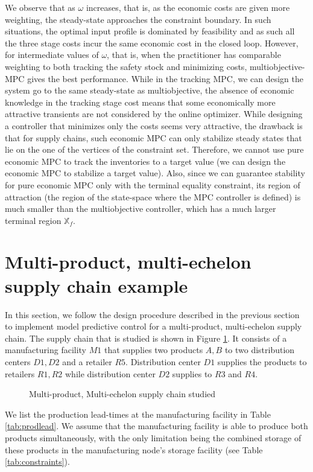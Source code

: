 \documentclass[10pt]{article}
\theoremstyle{definition}
\begin{document}
We observe that as $\omega$ increases, that is, as the economic costs
are given more weighting, the steady-state approaches the constraint
boundary. In such situations, the optimal input profile is dominated
by feasibility and as such all the three stage costs incur the same
economic cost in the closed loop. However, for intermediate values of
$\omega$, that is, when the practitioner has comparable weighting to
both tracking the safety stock and minimizing costs,
multiobjective-MPC gives the best performance. While in the tracking
MPC, we can design the system go to the same steady-state as multiobjective, the absence of
economic knowledge in the tracking stage cost means that some
economically more attractive transients are not considered by the
online optimizer. While designing a controller that minimizes only the
costs seems very attractive, the drawback is that for supply chains, such economic MPC can only stabilize steady states
that lie on the one of the vertices of the constraint set. Therefore,
we cannot use pure economic MPC to track the inventories to a target
value (we can design the economic MPC to stabilize a target
value). Also, since we can guarantee stability for pure economic MPC
only with the terminal equality constraint, its region of attraction (the
region of the state-space where the MPC controller is defined) is much
smaller than the multiobjective controller, which has a much larger
terminal region $\mathbb{X}_f$. 

\section{Multi-product, multi-echelon supply chain example}
\label{sec:multi_example}
In this section, we follow the design procedure described in the
previous section to implement model predictive control for a
multi-product, multi-echelon supply chain. The supply chain that is
studied is shown in Figure \ref{fig:lssc}. It consists of a
manufacturing facility $M1$ that supplies two products $A,B$ to two
distribution centers $D1,D2$ and a retailer $R5$. Distribution center
$D1$ supplies the products to retailers $R1,R2$ while distribution
center $D2$ supplies to $R3$ and $R4$. 

\begin{figure}
\centering
\scriptsize
\resizebox{0.5\textwidth}{!}{}
\caption{Multi-product, Multi-echelon supply chain studied}
\label{fig:lssc}
\end{figure}

We list the production lead-times at the manufacturing facility in
Table \ref{tab:prodlead}. We assume that the manufacturing facility is
able to produce both products simultaneously, with the only limitation
being the combined storage of these products in the manufacturing
node's storage facility (see Table \ref{tab:constraints}).
 
\end{document}
